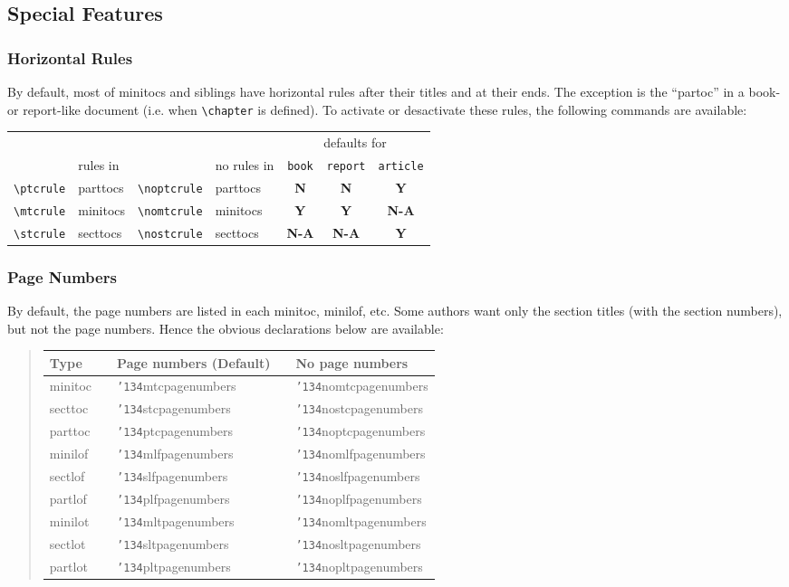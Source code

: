 \documentclass[12pt,a4paper]{book}
\def\bs{{\tt\char'134}}
\begin{document}
\subsection{Special Features}
\subsubsection{Horizontal Rules}
By default, most of minitocs and siblings have horizontal rules after their
titles and at their ends. The exception is the ``partoc'' in a book- or
report-like document (i.e. when \verb|\chapter| is defined). To activate
or desactivate these rules, the following commands are available:
\begin{center}
\begin{tabular}{llllccc}
&&&&\multicolumn{3}{c}{defaults for}\\
&rules in&&no rules in&\tt book&\tt report&\tt article\\\hline
\verb|\ptcrule|&parttocs&\verb|\noptcrule|&parttocs&{\bf N}&{\bf N}&{\bf Y}\\
\verb|\mtcrule|&minitocs&\verb|\nomtcrule|&minitocs&{\bf Y}&{\bf Y}&{\bf N-A}\\
\verb|\stcrule|&secttocs&\verb|\nostcrule|&secttocs%
&{\bf N-A}&{\bf N-A}&{\bf Y}\\
\end{tabular}
\end{center}
\subsubsection{Page Numbers}
By default, the page numbers are listed in each minitoc, minilof, etc.
Some authors want only the section titles (with the section numbers),
but not the page numbers. Hence the obvious declarations below are available:
\begin{quote}\tt\begin{tabular}{|ll|lc|l|}
\hline
{\bf Type}&&{\vphantom{$P^2_3$}\hfill\bf Page numbers (Default)\hfill}&&%
{\hfill\bf No page numbers\hfill}\\\hline
\rm minitoc&&\bs mtcpagenumbers&\qquad&\bs nomtcpagenumbers\\
\rm secttoc&&\bs stcpagenumbers&\qquad&\bs nostcpagenumbers\\
\rm parttoc&&\bs ptcpagenumbers&\qquad&\bs noptcpagenumbers\\
\rm minilof&&\bs mlfpagenumbers&\qquad&\bs nomlfpagenumbers\\
\rm sectlof&&\bs slfpagenumbers&\qquad&\bs noslfpagenumbers\\
\rm partlof&&\bs plfpagenumbers&\qquad&\bs noplfpagenumbers\\
\rm minilot&&\bs mltpagenumbers&\qquad&\bs nomltpagenumbers\\
\rm sectlot&&\bs sltpagenumbers&\qquad&\bs nosltpagenumbers\\
\rm partlot&&\bs pltpagenumbers&\qquad&\bs nopltpagenumbers\\
\hline
\end{tabular}\end{quote}
\end{document}
